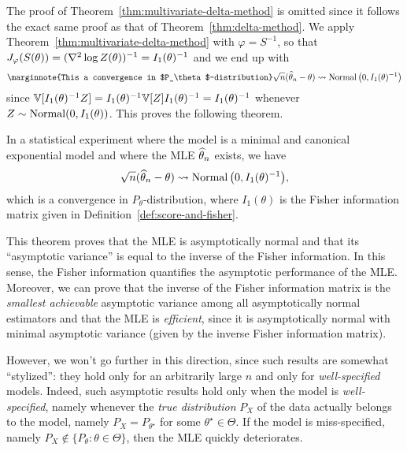 The proof of Theorem~\ref{thm:multivariate-delta-method} is omitted since it follows the exact same proof as that of Theorem~\ref{thm:delta-method}.
We apply%
Theorem~\ref{thm:multivariate-delta-method} with $\varphi = S^{-1}$, 
so that $J_\varphi(S(\theta)) = (\nabla^2 \log Z(\theta))^{-1} = I_1(\theta)^{-1}$ and we end up with
\begin{equation*}
	\marginnote{This a convergence in $P_\theta$-distribution}
	\sqrt n (\wh \theta_n - \theta) \gosto \nor\big( 0, I_1(\theta)^{-1} \big)
\end{equation*}
since $\mathbb V[I_1(\theta)^{-1} Z] = I_1(\theta)^{-1} \mathbb V[ Z] I_1(\theta)^{-1} = I_1(\theta)^{-1}$ whenever $Z \sim \operatorname{Normal}( 0, I_1(\theta))$.
This proves the following theorem.
\begin{theorem}
	In a statistical experiment where the model is a minimal and canonical exponential model and where the MLE $\widehat \theta_n$ exists, we have
	\begin{equation*}
		\sqrt n (\widehat \theta_n - \theta) \leadsto \operatorname{Normal}\big( 0, I_1(\theta)^{-1} \big),
	\end{equation*}
	which is a convergence in $P_\theta$-distribution, where $I_1(\theta)$ is the Fisher information matrix given in Definition~\ref{def:score-and-fisher}.
\end{theorem}
This theorem proves that the MLE is asymptotically normal and that its ``asymptotic variance'' is equal to the inverse of the Fisher information.
In this sense, the Fisher information quantifies the asymptotic performance of the MLE.
Moreover, we can prove that the inverse of the Fisher information matrix is the \emph{smallest achievable} asymptotic variance among all asymptotically normal estimators%
and that the MLE is \emph{efficient}, since it is asymptotically normal with minimal asymptotic variance (given by the inverse Fisher information matrix).

However, we won't go further in this direction, since such results are somewhat ``stylized'': they hold only for an arbitrarily large $n$ and only for \emph{well-specified} models.
Indeed, such asymptotic results hold only when the model is \emph{well-specified}, namely whenever the \emph{true distribution} $P_X$ of the data actually belongs to the model, namely $P_X = P_{\theta^\star}$ for some $\theta^\star \in \Theta$.
If the model is miss-specified, namely $P_X \notin \{ P_\theta : \theta \in \Theta \}$, then the MLE quickly deteriorates.
